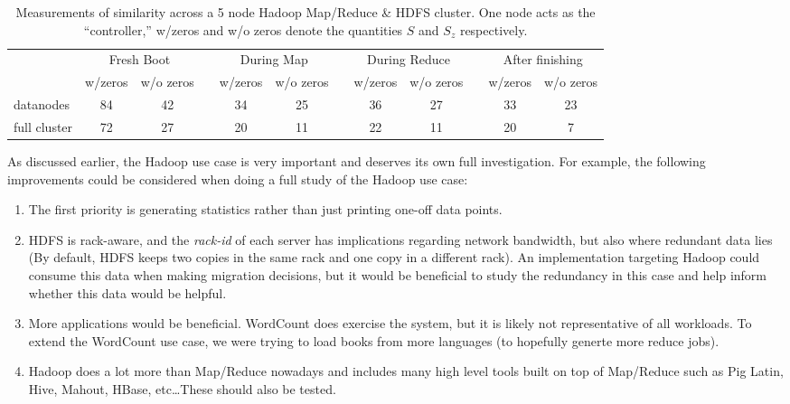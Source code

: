 \documentclass{acm_proc_article-sp}
\begin{document}
\begin{table}
  \begin{tabular}{lccccccccccc}
    \toprule
    & \multicolumn{2}{c}{Fresh Boot} && \multicolumn{2}{c}{During Map} && \multicolumn{2}{c}{During Reduce} && \multicolumn{2}{c}{After finishing}\\
    \cmidrule{2-3} \cmidrule{5-6} \cmidrule{8-9} \cmidrule{11-12}
    & w/zeros & w/o zeros && w/zeros & w/o zeros && w/zeros & w/o zeros && w/zeros & w/o zeros\\
    \midrule
      datanodes & 84 & 42 && 34 & 25 && 36 & 27 && 33 & 23\\
      full cluster & 72 & 27 && 20 & 11 &&  22 & 11 && 20 & 7\\
    \bottomrule
  \end{tabular}
  \caption{Measurements of similarity across a 5 node Hadoop Map/Reduce \& HDFS cluster.  One node acts as the ``controller,'' w/zeros and w/o zeros denote the quantities $S$ and $S_z$ respectively.}\label{tab:hadoop}
\end{table}

As discussed earlier, the Hadoop use case is very important and deserves its own full investigation.  For example, the following improvements could be considered when doing a full study of the Hadoop use case:
\begin{enumerate}
  \item The first priority is generating statistics rather than just printing one-off data points.
  \item HDFS is rack-aware, and the \textit{rack-id} of each server has implications regarding network bandwidth, but also where redundant data lies (By default, HDFS keeps two copies in the same rack and one copy in a different rack).  An implementation targeting Hadoop could consume this data when making migration decisions, but it would be beneficial to study the redundancy in this case and help inform whether this data would be helpful.
  \item More applications would be beneficial. WordCount does exercise the system, but it is likely not representative of all workloads.  To extend the WordCount use case, we were trying to load books from more languages (to hopefully generte more reduce jobs).
  \item Hadoop does a lot more than Map/Reduce nowadays and includes many high level tools built on top of Map/Reduce such as Pig Latin, Hive, Mahout, HBase, etc\ldots These should also be tested.
\end{enumerate}
\end{document}

